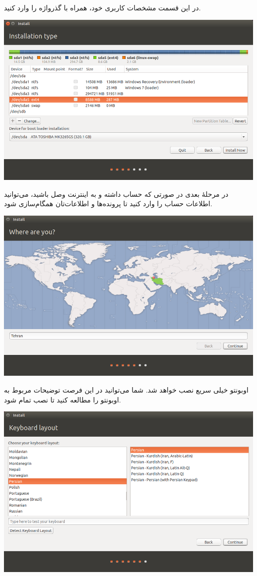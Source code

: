 در این قسمت مشخصات کاربری خود، همراه با گذرواژه را وارد کنید.
\begin{center}
\includegraphics[scale=0.43]{pics/8.png}
\end{center}
در مرحلهٔ بعدی در صورتی که حساب  داشته و به اینترنت وصل باشید، می‌توانید اطلاعات حساب را وارد کنید تا پرونده‌ها و اطلاعات‌تان همگام‌سازی شود.
\begin{center}
\includegraphics[scale=0.43]{pics/9.png}
\end{center}
اوبونتو خیلی سریع نصب خواهد شد. شما می‌توانید در این فرصت توضیحات مربوط به اوبونتو را مطالعه کنید تا نصب تمام شود.
\begin{center}
\includegraphics[scale=0.45]{pics/10.png}
\end{center}
